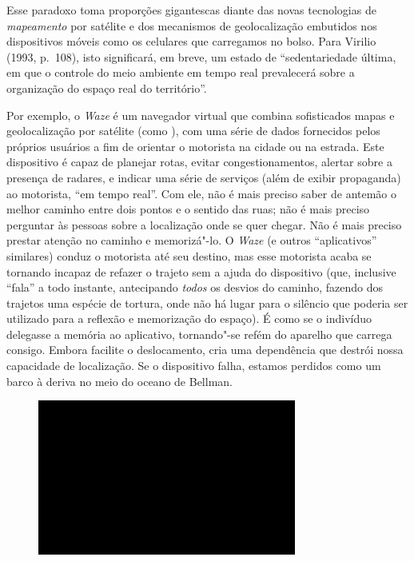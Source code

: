 Esse paradoxo toma proporções gigantescas diante das novas tecnologias
de \emph{mapeamento} por satélite e dos mecanismos de geolocalização
embutidos nos dispositivos móveis como os celulares que carregamos no
bolso. Para Virilio (1993, p.~108), isto significará, em breve, um
estado de ``sedentariedade última, em que o controle do meio ambiente em
tempo real prevalecerá sobre a organização do espaço real do
território''.

Por exemplo, o \emph{Waze} é um navegador virtual que combina sofisticados
mapas e geolocalização por satélite (como ), com uma série de dados
fornecidos pelos próprios usuários a fim de orientar o motorista na
cidade ou na estrada. Este dispositivo é capaz de planejar rotas, evitar
congestionamentos, alertar sobre a presença de radares, e indicar uma
série de serviços (além de exibir propaganda) ao motorista, ``em tempo
real''. Com ele, não é mais preciso saber de antemão o melhor caminho
entre dois pontos e o sentido das ruas; não é mais preciso perguntar às
pessoas sobre a localização onde se quer chegar. Não é mais preciso
prestar atenção no caminho e memorizá"-lo. O \emph{Waze} (e outros
``aplicativos'' similares) conduz o motorista até seu destino, mas esse
motorista acaba se tornando incapaz de refazer o trajeto sem a ajuda do
dispositivo (que, inclusive ``fala'' a todo instante, antecipando
\emph{todos} os desvios do caminho, fazendo dos trajetos uma espécie de
tortura, onde não há lugar para o silêncio que poderia ser utilizado
para a reflexão e memorização do espaço). É como se o indivíduo delegasse
a memória ao aplicativo, tornando"-se refém do aparelho que carrega consigo.
Embora facilite o
deslocamento, cria uma dependência que destrói nossa capacidade de
localização. Se o dispositivo falha, estamos perdidos como um barco à deriva no meio do oceano de Bellman.

\begin{figure}[!ht]

\centering
 \includegraphics[width=85mm]{./imgs/im1.jpg}
\caption{\tiny{}}

\end{figure}

